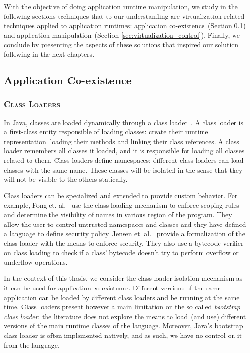 With the objective of doing application runtime manipulation, we study in the following sections techniques that to our understanding are virtualization-related techniques applied to application runtimes: application co-existence~(Section \ref{sec:virtualization_coexistence}) and application manipulation~(Section \ref{sec:virtualization_control}). Finally, we conclude by presenting the aspects of these solutions that inspired our solution following in the next chapters.%

\subsection{Application Co-existence}\label{sec:virtualization_coexistence}

\subsubsection*{\textsc{Class Loaders}}
In Java, classes are loaded dynamically through a class loader~\cite{Lian98a}. A class loader is a first-class entity responsible of loading classes: create their runtime representation, loading their methods and linking their class references. A class loader remembers all classes it loaded, and it is responsible for loading all classes related to  them. Class loaders define namespaces: different class loaders can load classes with the same name. These classes will be isolated in the sense that they will not be visible to the others statically.

Class loaders can be specialized and extended to provide custom behavior. For example, Fong et. al.~\cite{Fong10a} use the class loading mechanism to enforce scoping rules and determine the visibility of names in various region of the program. They allow the user to control untrusted
namespaces and classes and they have defined a language to define security policy. Jensen et. al.~\cite{Jens98a} provide a formalization of the class loader with the means to enforce security. They also use a bytecode verifier on class loading to check if a class' bytecode doesn't try to perform overflow or underflow operations.

In the context of this thesis, we consider the class loader isolation mechanism as it can be used for application co-existence. Different versions of the same application can be loaded by different class loaders and be running at the same time. Class loaders present however a main limitation on the so called \emph{bootstrap class loader}: the literature does not explore the means to load~(and use) different versions of the main runtime classes of the language. Moreover, Java's bootstrap class loader is often implemented natively, and as such, we have no control on it from the language.

